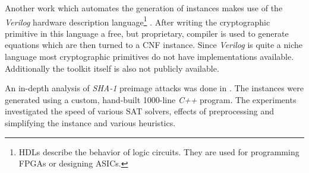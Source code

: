 Another work which automates the generation of instances makes use of the \emph{Verilog} hardware description language\footnote{HDLs describe the behavior of logic circuits. They are used for programming FPGAs or designing ASICs.} \cite{morawiecki2013sat}.
After writing the cryptographic primitive in this language a free, but proprietary, compiler is used to generate equations which are then turned to a CNF instance.
Since \emph{Verilog} is quite a niche language most cryptographic primitives do not have implementations available.
Additionally the toolkit itself is also not publicly available.

An in-depth analysis of \emph{SHA-1} preimage attacks was done in \cite{nossum2012sat}.
The instances were generated using a custom, hand-built 1000-line \emph{C++} program.
The experiments investigated the speed of various SAT solvers, effects of preprocessing and simplifying the instance and various heuristics.


%
%
% 

